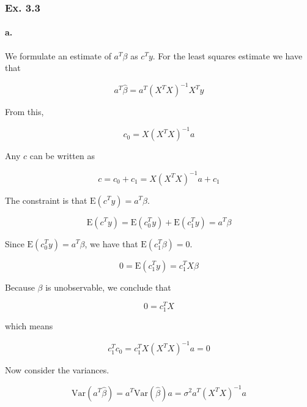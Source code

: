 \documentclass{article}
\begin{document}
\subsubsection{Ex. 3.3}

\paragraph{a.} We formulate an estimate of $a^T\beta$ as $c^Ty$. For the least squares estimate we have that

\begin{equation}
    a^T \hat{\beta} = a^T (X^TX)^{-1}X^T y
\end{equation}

From this,

\begin{equation}
    c_0 = X(X^TX)^{-1}a
\end{equation}

Any $c$ can be written as

\begin{equation}
    c = c_0 + c_1 = X(X^TX)^{-1}a + c_1
\end{equation}

The constraint is that $\text{E}(c^Ty) = a^T\beta$.

\begin{equation}
    \text{E}(c^Ty) = \text{E}(c^T_0 y) + \text{E}(c^T_1 y) = a^T \beta
\end{equation}

Since $\text{E}(c^T_0 y) = a^T \beta$, we have that $\text{E}(c^T_1 \beta) = 0$.

\begin{equation}
    0 = \text{E}(c^T_1 y) = c^T_1 X \beta
\end{equation}

Because $\beta$ is unobservable, we conclude that

\begin{equation}
    0 = c^T_1 X
\end{equation}

which means

\begin{equation} \label{eq:ex3_3_a_constrain}
    c^T_1 c_0 = c^T_1 X (X^TX)^{-1}a = 0
\end{equation}

Now consider the variances.

\begin{equation}
    \text{Var}(a^T \hat{\beta}) = a^T \text{Var}(\hat{\beta}) a = \sigma^2 a^T (X^TX)^{-1} a
\end{equation}
\end{document}
